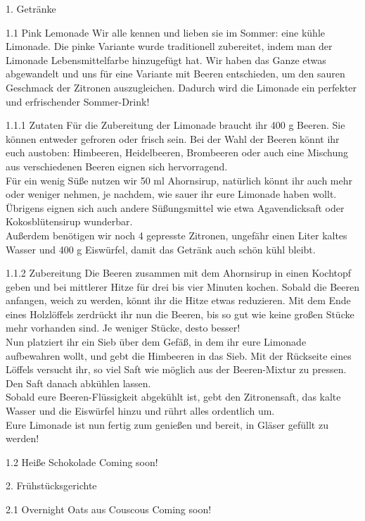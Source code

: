 
	1. Getränke
	
	1.1 Pink Lemonade
	Wir alle kennen und lieben sie im Sommer: eine kühle Limonade. Die pinke Variante wurde traditionell zubereitet, indem man der Limonade Lebensmittelfarbe hinzugefügt hat. Wir haben das Ganze etwas abgewandelt und uns für eine Variante mit Beeren entschieden, um den sauren Geschmack der Zitronen auszugleichen. Dadurch wird die Limonade ein perfekter und erfrischender Sommer-Drink!
	
	1.1.1 Zutaten
	Für die Zubereitung der Limonade braucht ihr 400 g Beeren. Sie können entweder gefroren oder frisch sein. Bei der Wahl der Beeren könnt ihr euch austoben: Himbeeren, Heidelbeeren, Brombeeren oder auch eine Mischung aus verschiedenen Beeren eignen sich hervorragend. \\
	Für ein wenig Süße nutzen wir 50 ml Ahornsirup, natürlich könnt ihr auch mehr oder weniger nehmen, je nachdem, wie sauer ihr eure Limonade haben wollt. Übrigens eignen sich auch andere Süßungsmittel wie etwa Agavendicksaft oder Kokosblütensirup wunderbar. \\
	Außerdem benötigen wir noch 4 gepresste Zitronen, ungefähr einen Liter kaltes Wasser und 400 g Eiswürfel, damit das Getränk auch schön kühl bleibt.
	
	1.1.2 Zubereitung
	Die Beeren zusammen mit dem Ahornsirup in einen Kochtopf geben und bei mittlerer Hitze für drei bis vier Minuten kochen. Sobald die Beeren anfangen, weich zu werden, könnt ihr die Hitze etwas reduzieren. Mit dem Ende eines Holzlöffels zerdrückt ihr nun die Beeren, bis so gut wie keine großen Stücke mehr vorhanden sind. Je weniger Stücke, desto besser! \\
	Nun platziert ihr ein Sieb über dem Gefäß, in dem ihr eure Limonade aufbewahren wollt, und gebt die Himbeeren in das Sieb. Mit der Rückseite eines Löffels versucht ihr, so viel Saft wie möglich aus der Beeren-Mixtur zu pressen. Den Saft danach abkühlen lassen. \\
	Sobald eure Beeren-Flüssigkeit abgekühlt ist, gebt den Zitronensaft, das kalte Wasser und die Eiswürfel hinzu und rührt alles ordentlich um. \\
	Eure Limonade ist nun fertig zum genießen und bereit, in Gläser gefüllt zu werden!
	
	1.2 Heiße Schokolade
	Coming soon!
	
	2. Frühstücksgerichte
	
	2.1 Overnight Oats aus Couscous
	Coming soon!
	